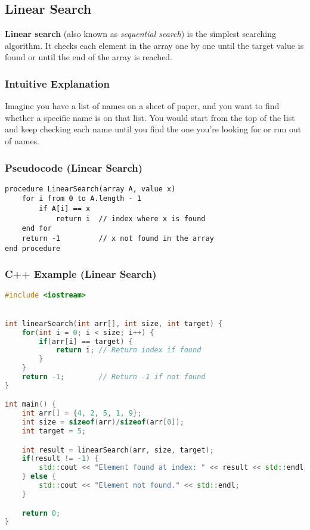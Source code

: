 \documentclass[a4paper,12pt]{article}
\begin{document}
\subsection{Linear Search}
\textbf{Linear search} (also known as \emph{sequential search}) is the simplest searching algorithm. It checks each element in the array one by one until the target value is found or until the end of the array is reached.

\subsubsection*{Intuitive Explanation}
Imagine you have a list of names on a sheet of paper, and you want to find whether a specific name is on that list. You would start from the top of the list and keep checking each name until you find the one you're looking for or run out of names.

\subsubsection*{Pseudocode (Linear Search)}
\begin{verbatim}
procedure LinearSearch(array A, value x)
    for i from 0 to A.length - 1
        if A[i] == x
            return i  // index where x is found
    end for
    return -1         // x not found in the array
end procedure
\end{verbatim}

\subsubsection*{C++ Example (Linear Search)}
\begin{lstlisting}[language=C++]
#include <iostream>


int linearSearch(int arr[], int size, int target) {
    for(int i = 0; i < size; i++) {
        if(arr[i] == target) {
            return i; // Return index if found
        }
    }
    return -1;        // Return -1 if not found
}

int main() {
    int arr[] = {4, 2, 5, 1, 9};
    int size = sizeof(arr)/sizeof(arr[0]);
    int target = 5;

    int result = linearSearch(arr, size, target);
    if(result != -1) {
        std::cout << "Element found at index: " << result << std::endl;
    } else {
        std::cout << "Element not found." << std::endl;
    }

    return 0;
}
\end{lstlisting}
\end{document}
